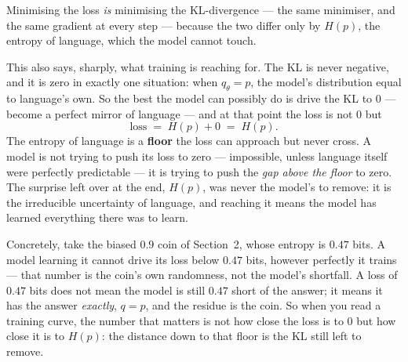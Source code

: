 \documentclass[11pt]{article}
\begin{document}
\begin{summary}
Minimising the loss \emph{is} minimising the KL-divergence --- the same minimiser, and the same
gradient at every step --- because the two differ only by $H(p)$, the entropy of language, which
the model cannot touch.
\end{summary}

This also says, sharply, what training is reaching for. The KL is never negative, and it is zero
in exactly one situation: when $q_\theta = p$, the model's distribution equal to language's own.
So the best the model can possibly do is drive the KL to $0$ --- become a perfect mirror of
language --- and at that point the loss is not $0$ but
\[
  \text{loss} \;=\; H(p) + 0 \;=\; H(p).
\]
The entropy of language is a \textbf{floor} the loss can approach but never cross. A model is not
trying to push its loss to zero --- impossible, unless language itself were perfectly predictable
--- it is trying to push the \emph{gap above the floor} to zero. The surprise left over at the
end, $H(p)$, was never the model's to remove: it is the irreducible uncertainty of language, and
reaching it means the model has learned everything there was to learn.

\begin{insight}
Concretely, take the biased $0.9$ coin of Section~2, whose entropy is $0.47$ bits. A model
learning it cannot drive its loss below $0.47$ bits, however perfectly it trains --- that number
is the coin's own randomness, not the model's shortfall. A loss of $0.47$ bits does not mean the
model is still $0.47$ short of the answer; it means it has the answer \emph{exactly}, $q = p$, and
the residue is the coin. So when you read a training curve, the number that matters is not how
close the loss is to $0$ but how close it is to $H(p)$: the distance down to that floor is the KL
still left to remove.
\end{insight}
\end{document}
